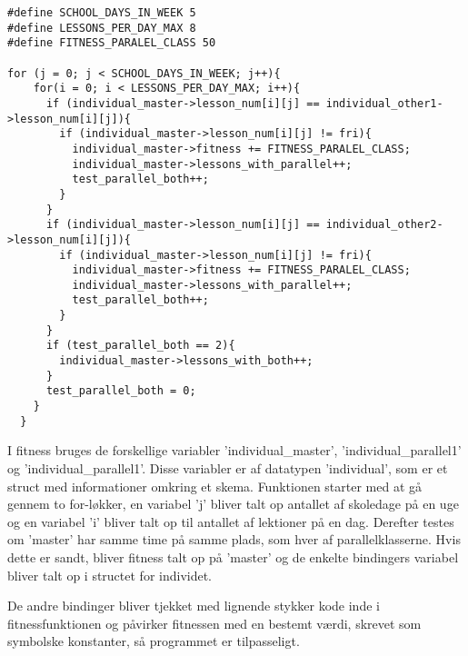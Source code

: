 \begin{lstlisting}
#define SCHOOL_DAYS_IN_WEEK 5
#define LESSONS_PER_DAY_MAX 8
#define FITNESS_PARALEL_CLASS 50

for (j = 0; j < SCHOOL_DAYS_IN_WEEK; j++){
    for(i = 0; i < LESSONS_PER_DAY_MAX; i++){
      if (individual_master->lesson_num[i][j] == individual_other1->lesson_num[i][j]){
        if (individual_master->lesson_num[i][j] != fri){
          individual_master->fitness += FITNESS_PARALEL_CLASS;
          individual_master->lessons_with_parallel++;
          test_parallel_both++;
        }
      }
      if (individual_master->lesson_num[i][j] == individual_other2->lesson_num[i][j]){
        if (individual_master->lesson_num[i][j] != fri){
          individual_master->fitness += FITNESS_PARALEL_CLASS;
          individual_master->lessons_with_parallel++;
          test_parallel_both++;
        }
      }
      if (test_parallel_both == 2){
        individual_master->lessons_with_both++;
      }
      test_parallel_both = 0;
    }
  }
\end{lstlisting}

I fitness bruges de forskellige variabler ’individual\_master’, ’individual\_parallel1’ og ’individual\_parallel1’. Disse variabler er af datatypen ’individual’, som er et struct med informationer omkring et skema.
Funktionen starter med at gå gennem to for-løkker, en variabel ’j’ bliver talt op antallet af skoledage på en uge og en variabel ’i’ bliver talt op til antallet af lektioner på en dag. Derefter testes om ’master’ har samme time på samme plads, som hver af parallelklasserne. Hvis dette er sandt, bliver fitness talt op på ’master’ og de enkelte bindingers variabel bliver talt op i structet for individet.

De andre bindinger bliver tjekket med lignende stykker kode inde i fitnessfunktionen og påvirker fitnessen med en bestemt værdi, skrevet som symbolske konstanter, så programmet er tilpasseligt.
